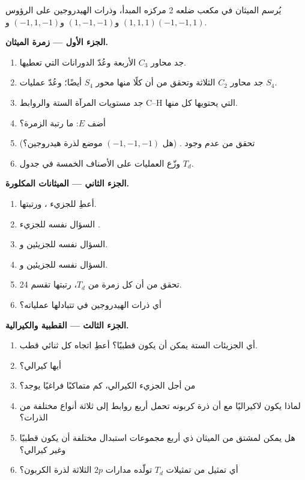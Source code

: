 \begin{problem}
\label{pb:b3:point-groups:1}
يُرسم الميثان في مكعب ضلعه 2 مركزه المبدأ، وذرات الهيدروجين
على الرؤوس $(1,1,1)$ و$(1,-1,-1)$ و$(-1,1,-1)$ و$(-1,-1,1)$.

\medskip\noindent\textbf{الجزء الأول --- زمرة الميثان.}
\begin{enumerate}
  \item جد محاور $C_3$ الأربعة وعُدّ الدورانات التي تعطيها.
  \item جد محاور $C_2$ الثلاثة وتحقق من أن كلًا منها محور $S_4$ أيضًا؛
        وعُدّ عمليات $S_4$.
  \item جد مستويات المرآة الستة والروابط C--H التي يحتويها كل منها.
  \item أضف $E$: ما رتبة الزمرة؟
  \item تحقق من عدم وجود . (هل $(-1,-1,-1)$ موضع
        لذرة هيدروجين؟)
  \item وزّع العمليات على الأصناف الخمسة في جدول $T_d$.
\end{enumerate}

\medskip\noindent\textbf{الجزء الثاني --- الميثانات المكلورة.}
\begin{enumerate}[resume]
  \item أعطِ  للجزيء ، ورتبتها.
  \item السؤال نفسه للجزيء .
  \item السؤال نفسه للجزيئين  و.
  \item السؤال نفسه للجزيئين  و.
  \item تحقق من أن كل زمرة  من $T_d$، رتبتها تقسم 24.
  \item أي ذرات الهيدروجين في  تتبادلها عملياته؟
\end{enumerate}

\medskip\noindent\textbf{الجزء الثالث --- القطبية والكيرالية.}
\begin{enumerate}[resume]
  \item أي الجزيئات الستة يمكن أن يكون قطبيًا؟ أعطِ اتجاه كل
        ثنائي قطب.
  \item أيها كيرالي؟
  \item من أجل الجزيء الكيرالي، كم متماكبًا فراغيًا يوجد؟
  \item لماذا يكون  لاكيراليًا مع أن ذرة كربونه تحمل أربع روابط إلى
        ثلاثة أنواع مختلفة من الذرات؟
  \item هل يمكن لمشتق من الميثان ذي أربع مجموعات استبدال مختلفة أن يكون
        قطبيًا وغير كيرالي؟
  \item أي تمثيل من تمثيلات $T_d$ تولّده مدارات $2p$ الثلاثة لذرة
        الكربون؟
\end{enumerate}


\end{problem}

